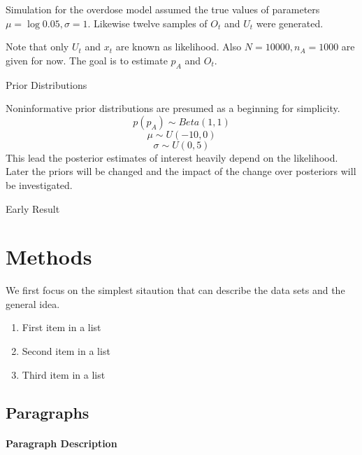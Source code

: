 \documentclass[
10pt, %
a4paper, %
oneside, %
headinclude,footinclude, %
BCOR5mm, %
]{scrartcl}
\begin{document}
\begin{enumerate}
	Simulation for the overdose model assumed the true values of parameters $\mu=\log0.05, \sigma=1$. Likewise twelve samples of $O_t$ and $U_t$ were generated. 
	
	
	Note that only $U_t$ and $x_t$ are known as likelihood. Also $N=10000, n_A = 1000$ are given for now. The goal is to estimate $p_A$ and $O_t$. 
	
	
	\large Prior Distributions
	
	\normalsize Noninformative prior distributions are presumed as a beginning for simplicity. 
	$$p(p_A) \sim Beta(1,1)$$
	$$\mu \sim U(-10,0)$$ 
	$$\sigma \sim U(0,5)$$
	This lead the posterior estimates of interest heavily depend on the likelihood. Later the priors will be changed and the impact of the change over posteriors will be investigated. 
	
	\large Early Result
	
	\normalsize 
\end{enumerate}


 

\section{Methods}
We first focus on the simplest sitaution that can describe the data sets and the general idea.


\begin{enumerate}[noitemsep] %
\item First item in a list
\item Second item in a list
\item Third item in a list
\end{enumerate}


\subsection{Paragraphs}


\paragraph{Paragraph Description} %
\end{document}
